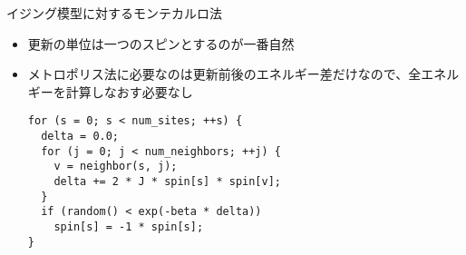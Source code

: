 \begin{frame}[t,fragile]{イジング模型に対するモンテカルロ法}
  \begin{itemize}
  \item 更新の単位は一つのスピンとするのが一番自然
  \item メトロポリス法に必要なのは更新前後のエネルギー差だけなので、全エネルギーを計算しなおす必要なし
\begin{verbatim}
for (s = 0; s < num_sites; ++s) {
  delta = 0.0;
  for (j = 0; j < num_neighbors; ++j) {
    v = neighbor(s, j);
    delta += 2 * J * spin[s] * spin[v];
  }
  if (random() < exp(-beta * delta))
    spin[s] = -1 * spin[s];
}  
\end{verbatim}
  \end{itemize}
\end{frame}
